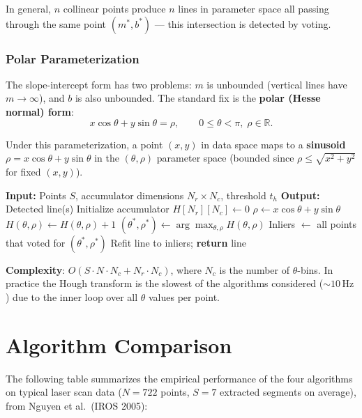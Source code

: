 \documentclass[11pt,a4paper]{article}
\theoremstyle{definition}
\theoremstyle{plain}
\theoremstyle{remark}
\begin{document}
In general, $n$ collinear points produce $n$ lines in parameter space all passing through the same point $(m^*, b^*)$ — this intersection is detected by voting.

\subsubsection*{Polar Parameterization}

The slope-intercept form has two problems: $m$ is unbounded (vertical lines have $m \to \infty$), and $b$ is also unbounded. The standard fix is the \textbf{polar (Hesse normal) form}:
\[
x\cos\theta + y\sin\theta = \rho, \qquad 0 \le \theta < \pi,\; \rho \in \mathbb{R}.
\]

Under this parameterization, a point $(x, y)$ in data space maps to a \textbf{sinusoid} $\rho = x\cos\theta + y\sin\theta$ in the $(\theta, \rho)$ parameter space (bounded since $\rho \leq \sqrt{x^2+y^2}$ for fixed $(x,y)$).

\begin{algorithm}
\caption{Hough Transform}
\begin{algorithmic}
\STATE \textbf{Input:} Points $S$, accumulator dimensions $N_r \times N_c$, threshold $t_h$
\STATE \textbf{Output:} Detected line(s)
\STATE Initialize accumulator $H[N_r][N_c] \leftarrow 0$
        \STATE $\rho \leftarrow x\cos\theta + y\sin\theta$
        \STATE $H(\theta, \rho) \leftarrow H(\theta, \rho) + 1$
    \ENDFOR
\ENDFOR
\STATE $(\theta^*, \rho^*) \leftarrow \arg\max_{\theta, \rho} H(\theta, \rho)$
    \STATE Inliers $\leftarrow$ all points that voted for $(\theta^*, \rho^*)$
    \STATE Refit line to inliers; \textbf{return} line
\ENDIF
\end{algorithmic}
\end{algorithm}

\textbf{Complexity}: $O(S \cdot N \cdot N_c + N_r \cdot N_c)$, where $N_c$ is the number of $\theta$-bins. In practice the Hough transform is the slowest of the algorithms considered ($\sim 10\,\text{Hz}$) due to the inner loop over all $\theta$ values per point.

\section{Algorithm Comparison}

The following table summarizes the empirical performance of the four algorithms on typical laser scan data ($N = 722$ points, $S = 7$ extracted segments on average), from Nguyen et al.\ (IROS 2005):
\end{document}
